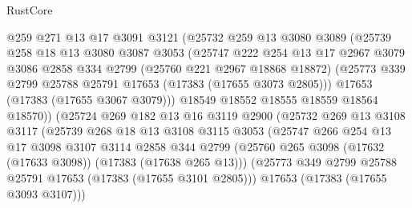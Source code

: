 \begin{lexlean}{RustCore}
\begin{coremodule}
                      @259
                      @271
                      @13
                      @17
                      @3091
                      @3121
                      (@25732
                        @259
                        @13
                        @3080
                        @3089
                        (@25739
                          @258
                          @18
                          @13
                          @3080
                          @3087
                          @3053
                          (@25747
                            @222
                            @254
                            @13
                            @17
                            @2967
                            @3079
                            @3086
                            @2858
                            @334
                            @2799
                            (@25760 @221 @2967 @18868 @18872)
                            (@25773 @339 @2799 @25788 @25791 @17653 (@17383 (@17655 @3073 @2805)))
                            @17653
                            (@17383 (@17655 @3067 @3079)))
                          @18549
                          @18552
                          @18555
                          @18559
                          @18564
                          @18570))
                      (@25724
                        @269
                        @182
                        @13
                        @16
                        @3119
                        @2900
                        (@25732
                          @269
                          @13
                          @3108
                          @3117
                          (@25739
                            @268
                            @18
                            @13
                            @3108
                            @3115
                            @3053
                            (@25747
                              @266
                              @254
                              @13
                              @17
                              @3098
                              @3107
                              @3114
                              @2858
                              @344
                              @2799
                              (@25760 @265 @3098 (@17632 (@17633 @3098)) (@17383 (@17638 @265 @13)))
                              (@25773 @349 @2799 @25788 @25791 @17653 (@17383 (@17655 @3101 @2805)))
                              @17653
                              (@17383 (@17655 @3093 @3107)))

\end{coremodule}
\end{lexlean}
